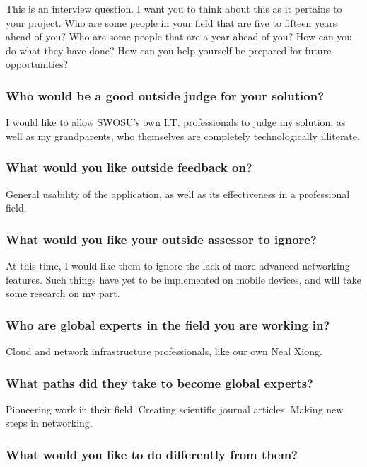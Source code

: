 \documentclass[letterpaper]{article}            %
\begin{document}
This is an interview question. I want you to think about this as it pertains to your project. Who are some people in your field that are five to fifteen years ahead of you? Who are some people that are a year ahead of you? How can you do what they have done? How can you help yourself be prepared for future opportunities?

\subsubsection{Who would be a good outside judge for your solution?}

I would like to allow SWOSU's own I.T. professionals to judge my solution, as well as my grandparents, who themselves are completely technologically illiterate.

\subsubsection{What would you like outside feedback on?}

General usability of the application, as well as its effectiveness in a professional field.

\subsubsection{What would you like your outside assessor to ignore?}

At this time, I would like them to ignore the lack of more advanced networking features. Such things have yet to be implemented on mobile devices, and will take some research on my part.

\subsubsection{Who are global experts in the field you are working in?}

Cloud and network infrastructure professionals, like our own Neal Xiong.

\subsubsection{What paths did they take to become global experts?}

Pioneering work in their field. Creating scientific journal articles. Making new steps in networking.

\subsubsection{What would you like to do differently from them?}
\end{document}
